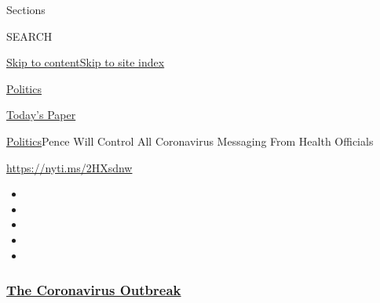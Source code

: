 Sections

SEARCH

\protect\hyperlink{site-content}{Skip to
content}\protect\hyperlink{site-index}{Skip to site index}

\href{https://www.nytimes3xbfgragh.onion/section/politics}{Politics}

\href{https://myaccount.nytimes3xbfgragh.onion/auth/login?response_type=cookie\&client_id=vi}{}

\href{https://www.nytimes3xbfgragh.onion/section/todayspaper}{Today's
Paper}

\href{/section/politics}{Politics}\textbar{}Pence Will Control All
Coronavirus Messaging From Health Officials

\url{https://nyti.ms/2HXsdnw}

\begin{itemize}
\item
\item
\item
\item
\item
\end{itemize}

\hypertarget{the-coronavirus-outbreak}{%
\subsubsection{\texorpdfstring{\href{https://www.nytimes3xbfgragh.onion/news-event/coronavirus?name=styln-coronavirus-national\&region=TOP_BANNER\&variant=undefined\&block=storyline_menu_recirc\&action=click\&pgtype=Article\&impression_id=63e11ce0-e38e-11ea-aa92-b162d5bed6a1}{The
Coronavirus
Outbreak}}{The Coronavirus Outbreak}}\label{the-coronavirus-outbreak}}

